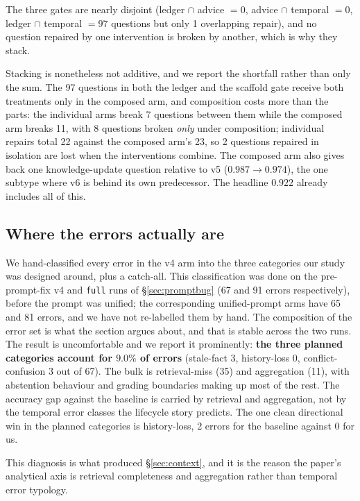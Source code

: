 \documentclass[11pt]{article}
\newcommand{\arm}[1]{\texttt{#1}}
\begin{document}
The three gates are nearly disjoint (ledger $\cap$ advice $= 0$, advice $\cap$ temporal $= 0$, ledger $\cap$ temporal $= 97$ questions but only 1 overlapping repair), and no question repaired by one intervention is broken by another, which is why they stack.

Stacking is nonetheless not additive, and we report the shortfall rather than only the sum. The 97 questions in both the ledger and the scaffold gate receive both treatments only in the composed arm, and composition costs more than the parts: the individual arms break 7 questions between them while the composed arm breaks 11, with 8 questions broken \emph{only} under composition; individual repairs total 22 against the composed arm's 23, so 2 questions repaired in isolation are lost when the interventions combine. The composed arm also gives back one knowledge-update question relative to v5 ($0.987 \rightarrow 0.974$), the one subtype where v6 is behind its own predecessor. The headline $0.922$ already includes all of this.

\subsection{Where the errors actually are}
\label{sec:errors}

We hand-classified every error in the v4 arm into the three categories our study was designed around, plus a catch-all. This classification was done on the pre-prompt-fix v4 and \arm{full} runs of \S\ref{sec:promptbug} (67 and 91 errors respectively), before the prompt was unified; the corresponding unified-prompt arms have 65 and 81 errors, and we have not re-labelled them by hand. The composition of the error set is what the section argues about, and that is stable across the two runs. The result is uncomfortable and we report it prominently: \textbf{the three planned categories account for $9.0\%$ of errors} (stale-fact 3, history-loss 0, conflict-confusion 3 out of 67). The bulk is retrieval-miss (35) and aggregation (11), with abstention behaviour and grading boundaries making up most of the rest. The accuracy gap against the baseline is carried by retrieval and aggregation, not by the temporal error classes the lifecycle story predicts. The one clean directional win in the planned categories is history-loss, 2 errors for the baseline against 0 for us.

This diagnosis is what produced \S\ref{sec:context}, and it is the reason the paper's analytical axis is retrieval completeness and aggregation rather than temporal error typology.
\end{document}
